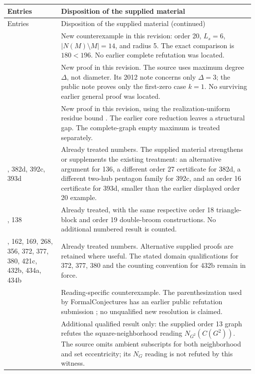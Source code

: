 \documentclass[11pt,a4paper]{article}
\theoremstyle{remark}
\begin{document}
\begingroup\small
\setlength{\LTpre}{5pt}\setlength{\LTpost}{5pt}
\begin{longtable}{@{}>{\raggedright\arraybackslash}p{2.5cm}>{\raggedright\arraybackslash}p{11.3cm}@{}}
\toprule Entries & Disposition of the supplied material\\\midrule
\endfirsthead
\toprule Entries & Disposition of the supplied material (continued)\\\midrule
\endhead
166 & New counterexample in this revision: order 20, $L_s=6$, $|N(M)\setminus M|=14$, and radius 5. The exact comparison is $180<196$. No earlier complete refutation was located.\\
290 & New proof in this revision. The source uses maximum degree $\Delta$, not diameter. Its 2012 note concerns only $\Delta=3$; the public note \cite{Partial290} proves only the first-zero case $k=1$. No surviving earlier general proof was located.\\
324 & New proof in this revision, using the realization-uniform residue bound \cite{FMS91}. The earlier core reduction \cite[\S7fn]{Audit} leaves a structural gap. The complete-graph empty maximum is treated separately.\\
136, 382d, 392c, 393d & Already treated numbers. The supplied material strengthens or supplements the existing treatment: an alternative argument for 136, a different order 27 certificate for 382d, a different two-hub pentagon family for 392c, and an order 16 certificate for 393d, smaller than the earlier displayed order 20 example.\\
76, 138 & Already treated, with the same respective order 18 triangle-block and order 19 double-broom constructions. No additional numbered result is counted.\\
161, 162, 169, 268, 356, 372, 377, 380, 421c, 432b, 434a, 434b & Already treated numbers. Alternative supplied proofs are retained where useful. The stated domain qualifications for 372, 377, 380 and the counting convention for 432b remain in force.\\
72 & Reading-specific counterexample. The parenthesization used by FormalConjectures has an earlier public refutation submission \cite{Prior72}; no unqualified new resolution is claimed.\\
186 & Additional qualified result only: the supplied order 13 graph refutes the square-neighborhood reading $N_{G^2}(C(G^2))$. The source omits ambient subscripts for both neighborhood and set eccentricity; its $N_G$ reading is not refuted by this witness.\\

\end{longtable}
\end{document}
